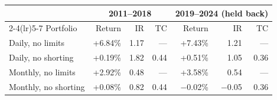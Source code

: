 \small
\begin{tabular}{lrrrrrr}
\toprule
 & \multicolumn{3}{c}{2011--2018} & \multicolumn{3}{c}{2019--2024 (held back)} \\
\cmidrule(lr){2-4}\cmidrule(lr){5-7}
Portfolio & Return & IR & TC & Return & IR & TC \\
\midrule
Daily, no limits & +6.84\% & 1.17 & --- & +7.43\% & 1.21 & --- \\
Daily, no shorting & +0.19\% & 1.82 & 0.44 & +0.51\% & 1.05 & 0.36 \\
Monthly, no limits & +2.92\% & 0.48 & --- & +3.58\% & 0.54 & --- \\
Monthly, no shorting & +0.08\% & 0.82 & 0.44 & $-$0.02\% & $-$0.05 & 0.36 \\
\bottomrule
\end{tabular}